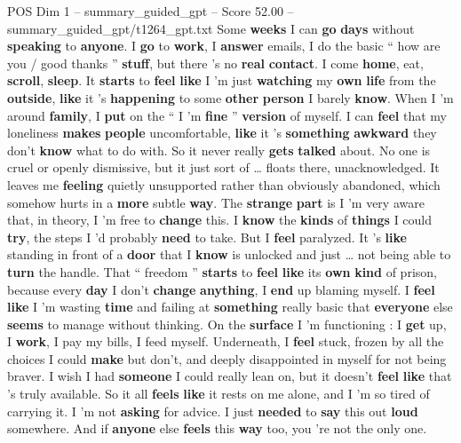 \begin{textsample}{POS Dim 1 – summary\_guided\_gpt – Score 52.00 – summary\_guided\_gpt/t1264\_gpt.txt}  \label{ex:f1_pos_029}
Some \textbf{weeks} I can \textbf{go} \textbf{days} without \textbf{speaking} to \textbf{anyone}.
I \textbf{go} to \textbf{work}, I \textbf{answer} emails, I do the basic “ how are you / good thanks ” \textbf{stuff}, but there ’s no \textbf{real} \textbf{contact}.
I come \textbf{home}, eat, \textbf{scroll}, \textbf{sleep}.
It \textbf{starts} to \textbf{feel} \textbf{like} I ’m just \textbf{watching} my \textbf{own} \textbf{life} from the \textbf{outside}, \textbf{like} it ’s \textbf{happening} to some \textbf{other} \textbf{person} I barely \textbf{know}.
When I ’m around \textbf{family}, I \textbf{put} on the “ I ’m \textbf{fine} ” \textbf{version} of myself.
I can \textbf{feel} that my loneliness \textbf{makes} \textbf{people} uncomfortable, \textbf{like} it ’s \textbf{something} \textbf{awkward} they don't \textbf{know} what to do with.
So it never really \textbf{gets} \textbf{talked} about.
No one is cruel or openly dismissive, but it just sort of … floats there, unacknowledged.
It leaves me \textbf{feeling} quietly unsupported rather than obviously abandoned, which somehow hurts in a \textbf{more} subtle \textbf{way}.
The \textbf{strange} \textbf{part} is I ’m very aware that, in theory, I ’m free to \textbf{change} this.
I \textbf{know} the \textbf{kinds} of \textbf{things} I could \textbf{try}, the steps I ’d probably \textbf{need} to take.
But I \textbf{feel} paralyzed.
It ’s \textbf{like} standing in front of a \textbf{door} that I \textbf{know} is unlocked and just … not being able to \textbf{turn} the handle.
That “ freedom ” \textbf{starts} to \textbf{feel} \textbf{like} its \textbf{own} \textbf{kind} of prison, because every \textbf{day} I don't \textbf{change} \textbf{anything}, I \textbf{end} up blaming myself.
I \textbf{feel} \textbf{like} I ’m wasting \textbf{time} and failing at \textbf{something} really basic that \textbf{everyone} else \textbf{seems} to manage without thinking.
On the \textbf{surface} I ’m functioning : I \textbf{get} up, I \textbf{work}, I pay my bills, I feed myself.
Underneath, I \textbf{feel} stuck, frozen by all the choices I could \textbf{make} but don't, and deeply disappointed in myself for not being braver.
I wish I had \textbf{someone} I could really lean on, but it doesn't \textbf{feel} \textbf{like} that ’s truly available.
So it all \textbf{feels} \textbf{like} it rests on me alone, and I ’m so tired of carrying it.
I ’m not \textbf{asking} for advice.
I just \textbf{needed} to \textbf{say} this out \textbf{loud} somewhere.
And if \textbf{anyone} else \textbf{feels} this \textbf{way} too, you ’re not the only one.

\end{textsample}

